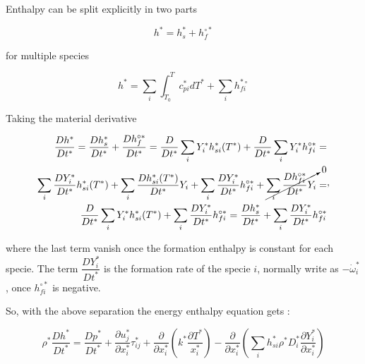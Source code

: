 Enthalpy can be split explicitly in two parts 

\begin{equation} 
    h^*=h_s^*+h_f^{\circ*}
\end{equation} 

for multiple species 

\begin{equation} 
    h^*=
    \sum_i
    \int_{T_0}^{T}
    c_{pi}^*dT^*
    +
    \sum_i h_{fi}^{*\circ}
\end{equation} 


Taking the material derivative

\begin{equation} 
\begin{split}
    \frac{D h^*}{D t^*}
    =
    \frac{D h_s^*}{D t^*}
    +
    \frac{D h_f^{\circ *}}{D t^*}
    =
    \frac{D }{D t^*}
    \sum_i Y_i^* h_{si}^*(T^*)
    +
    \frac{D }{D t^*}
    \sum_i Y_i^* h_{fi}^{\circ*}
    =
    \\
    \sum_i  
    \frac{D Y_i^*}{D t^*}
    h_{si}^*(T^*)
    +
    \sum_i  
    \frac{D h_{si}^*(T^*)}{D t^*}
    Y_i
    +
    \sum_i  
    \frac{D Y_i^*}{D t^*}
    h_{fi}^{\circ*}
    +
    \cancelto{0}{
    \sum_i  
    \frac{D h_{fi}^{\circ*}}{D t^*}
    Y_i
    }
    =
    \\
    \frac{D }{D t^*}
    \sum_i Y_i^* h_{si}^*(T^*)
    +
    \sum_i  
    \frac{D Y_i^*}{D t^*}
    h_{fi}^{\circ*}
    =
    \frac{D h_s^*}{D t^*}
    +
    \sum_i  
    \frac{D Y_i^*}{D t^*}
    h_{fi}^{\circ*}
\end{split} 
,
\end{equation} 

where the last term vanish once the formation enthalpy is constant for each specie. 
The term $\dfrac{D Y_i^*}{D t^*}$ is the formation rate of the specie $i$, normally 
write as $-\dot{\omega}_i^*$, once $h_{fi}^{\circ*}$ is negative.

%

So, with the above separation the  energy enthalpy equation gets :

\begin{equation}
\rho^*
\frac{D  h^* }{Dt^*}
=
\frac{D p^* }{Dt^*}
+
\frac{\partial u_j^*}{\partial x^*_i}
\tau_{ij}^*
+
\frac{\partial}{\partial x_i^*}
\left(
    k^*\frac{\partial T^*}{x_i^*}
\right)
-
\frac{\partial}{\partial x_i^*}
\left(
        \sum_i
        h_{si}^*
        \rho^*
        D_i^*
        \frac{\partial Y_i^*}{\partial x_i^*}
\right)
\end{equation} 


